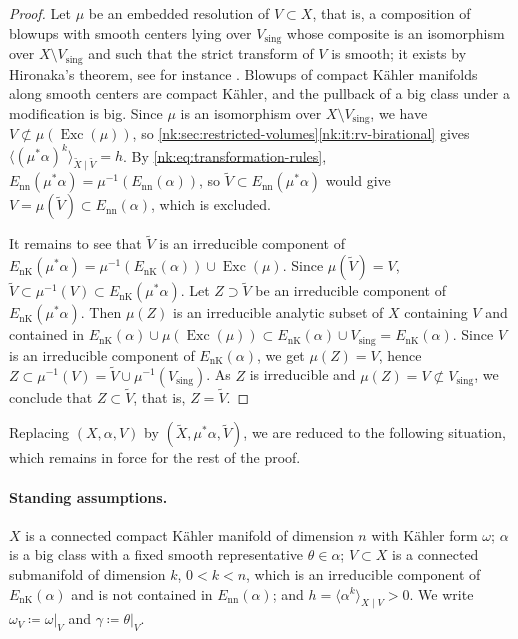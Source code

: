 \begin{proof}
Let $\mu$ be an embedded resolution of $V\subset X$, that is, a
composition of blowups with smooth centers lying over
$V_{\mathrm{sing}}$ whose composite is an isomorphism over
$X\setminus V_{\mathrm{sing}}$ and such that the strict transform of
$V$ is smooth; it exists by Hironaka's theorem, see for instance
\cite{BM97}. Blowups of compact K\"ahler
manifolds along smooth centers are compact K\"ahler, and the pullback of
a big class under a modification is big. Since $\mu$ is an isomorphism
over $X\setminus V_{\mathrm{sing}}$, we have
$V\not\subset\mu(\operatorname{Exc}(\mu))$, so
\cref{nk:sec:restricted-volumes}\ref{nk:it:rv-birational} gives
$\langle(\mu^*\alpha)^k\rangle_{\widetilde X\mid\widetilde V}=h$. By
\eqref{nk:eq:transformation-rules},
${E_{\mathrm{nn}}}(\mu^*\alpha)=\mu^{-1}({E_{\mathrm{nn}}}(\alpha))$, so
$\widetilde V\subset{E_{\mathrm{nn}}}(\mu^*\alpha)$ would give
$V=\mu(\widetilde V)\subset{E_{\mathrm{nn}}}(\alpha)$, which is excluded.

It remains to see that $\widetilde V$ is an irreducible component of
${E_{\mathrm{nK}}}(\mu^*\alpha)=\mu^{-1}({E_{\mathrm{nK}}}(\alpha))\cup\operatorname{Exc}(\mu)$. Since $\mu(\widetilde V)=V$,
$\widetilde V\subset\mu^{-1}(V)\subset{E_{\mathrm{nK}}}(\mu^*\alpha)$. Let
$Z\supset\widetilde V$ be an irreducible component of
${E_{\mathrm{nK}}}(\mu^*\alpha)$. Then $\mu(Z)$ is an irreducible analytic subset of
$X$ containing $V$ and contained in
${E_{\mathrm{nK}}}(\alpha)\cup\mu(\operatorname{Exc}(\mu))\subset{E_{\mathrm{nK}}}(\alpha)\cup V_{\mathrm{sing}}
={E_{\mathrm{nK}}}(\alpha)$. Since $V$ is an irreducible component of
${E_{\mathrm{nK}}}(\alpha)$, we get $\mu(Z)=V$, hence
$Z\subset\mu^{-1}(V)=\widetilde V\cup\mu^{-1}(V_{\mathrm{sing}})$. As
$Z$ is irreducible and $\mu(Z)=V\not\subset V_{\mathrm{sing}}$, we
conclude that $Z\subset\widetilde V$, that is, $Z=\widetilde V$.
\end{proof}

Replacing $(X,\alpha,V)$ by $(\widetilde X,\mu^*\alpha,\widetilde V)$,
we are reduced to the following situation, which remains in force for the
rest of the proof.

\paragraph{Standing assumptions.}
$X$ is a connected compact K\"ahler manifold of dimension $n$ with
K\"ahler form $\omega$; $\alpha$ is a big class with a fixed smooth
representative $\theta\in\alpha$; $V\subset X$ is a connected
submanifold of dimension $k$, $0<k<n$, which is an irreducible
component of ${E_{\mathrm{nK}}}(\alpha)$ and is not contained in ${E_{\mathrm{nn}}}(\alpha)$;
and $h=\langle\alpha^k\rangle_{X\mid V}>0$. We write
$\omega_V\coloneqq \omega|_V$ and $\gamma\coloneqq \theta|_V$.


